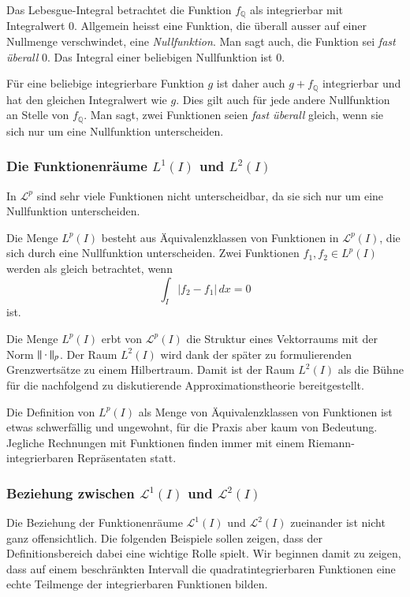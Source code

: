Das Lebesgue-Integral betrachtet die Funktion $f_{\mathbb Q}$ 
als integrierbar mit Integralwert $0$.
Allgemein heisst eine Funktion, die überall ausser auf einer Nullmenge
verschwindet, eine {\em Nullfunktion}.
Man sagt auch, die Funktion sei {\em fast überall} $0$.
Das Integral einer beliebigen Nullfunktion ist $0$.

Für eine beliebige integrierbare Funktion $g$ ist daher auch 
$g+f_{\mathbb Q}$ integrierbar und hat den gleichen Integralwert
wie $g$.
Dies gilt auch für jede andere Nullfunktion an Stelle von $f_{\mathbb Q}$.
Man sagt, zwei Funktionen seien {\em fast überall} gleich, wenn sie sich
nur um eine Nullfunktion unterscheiden.
%

\subsubsection{Die Funktionenräume $L^1(I)$ und $L^2(I)$}
In $\mathcal{L}^p$ sind sehr viele Funktionen nicht unterscheidbar,
da sie sich nur um eine Nullfunktion unterscheiden.

\begin{definition}
%
Die Menge $L^p(I)$ besteht aus Äquivalenzklassen von Funktionen in
$\mathcal{L}^p(I)$, die sich durch eine Nullfunktion unterscheiden.
Zwei Funktionen $f_1,f_2\in L^p(I)$ werden als gleich betrachtet,
wenn
\[
\int_I
|f_2-f_1|
\,dx
=0
\]
ist.
\end{definition}

Die Menge $L^p(I)$ erbt von $\mathcal{L}^p(I)$ die Struktur eines
Vektorraums mit der Norm $\|\mathstrut\cdot\mathstrut\|_p$.
Der Raum $L^2(I)$ wird dank der später zu formulierenden Grenzwertsätze zu
einem Hilbertraum.
Damit ist der Raum $L^2(I)$ als die Bühne für die nachfolgend zu diskutierende
Approximationstheorie bereitgestellt.

Die Definition von $L^p(I)$ als Menge von Äquivalenzklassen von Funktionen
ist etwas schwerfällig und ungewohnt, für die Praxis aber kaum von Bedeutung.
Jegliche Rechnungen mit Funktionen finden immer mit einem
Riemann-integrierbaren Repräsentaten statt.


\subsubsection{Beziehung zwischen $\mathcal{L}^1(I)$ und $\mathcal{L}^2(I)$}
Die Beziehung der Funktionenräume $\mathcal{L}^1(I)$ und $\mathcal{L}^2(I)$
zueinander ist nicht ganz offensichtlich.
Die folgenden Beispiele sollen zeigen, dass der Definitionsbereich
dabei eine wichtige Rolle spielt.
Wir beginnen damit zu zeigen, dass auf einem beschränkten Intervall
die quadratintegrierbaren Funktionen eine echte Teilmenge der integrierbaren
Funktionen bilden.


